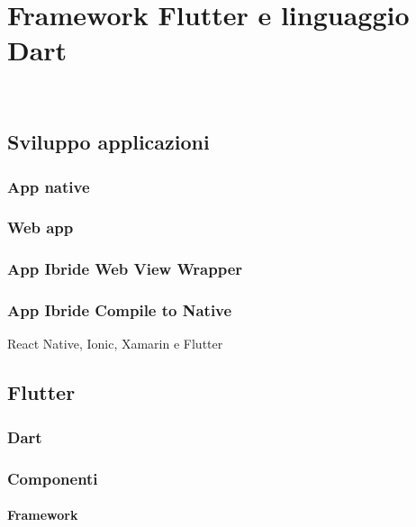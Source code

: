 
\chapter{Framework Flutter e linguaggio Dart}
\label{cap:Framework Flutter e linguaggio Dart}

\\

\section{Sviluppo applicazioni}

\subsection{App native}

\subsection{Web app}

\subsection{App Ibride Web View Wrapper}

\subsection{App Ibride Compile to Native}
React Native, Ionic, Xamarin e Flutter

\section{Flutter}

\subsection{Dart}

\subsection{Componenti}

\subsubsection{Framework}


